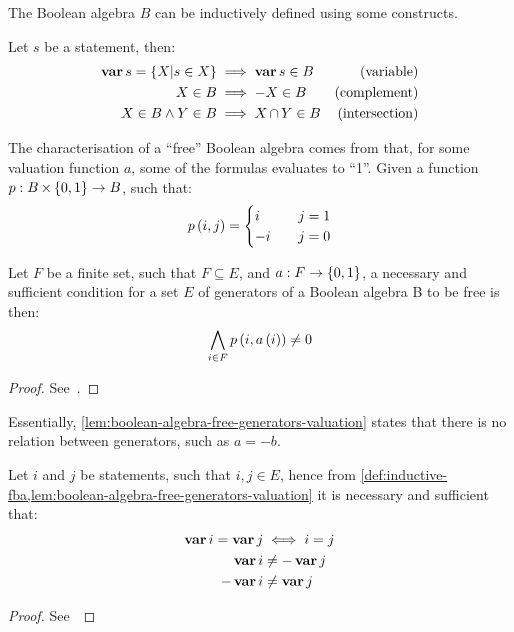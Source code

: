 \documentclass[en,twoside,onehalfspacing,phd]{risethesis}
\def\varop{\ensuremath\operatorname{\mathbf{var}}}
\newcommand{\var}[1]{\ensuremath\varop #1}
\newcommand{\setsin}[1]{\ensuremath\left\{ #1 \right\}}
\newcommand{\parsin}[1]{\ensuremath\left( #1 \right)}
\def\inter{\ensuremath\operatorname{\cap}}
\def\cartesian{\ensuremath\operatorname{\times}}
\begin{document}
The Boolean algebra $B$ can be inductively defined using some constructs.
%
\begin{Def}
\label{def:inductive-fba}
Let $s$ be a statement, then:
%
\begin{subequations}
\begin{align}
\var s = \setsin{X | s \in X} & \implies \var s \in B & \text{(variable)}\\
X \in B & \implies -X \in B                           & \text{(complement)}\\
X \in B \land Y \in B & \implies X \inter Y \in B     & \text{(intersection)}
\end{align}
\end{subequations}
%
\end{Def}

The characterisation of a ``free'' Boolean algebra comes from that, for some valuation function $a$, some of the formulas evaluates to ``1''. 
Given a function $p:B \cartesian \setsin{0,1} \rightarrow B$, such that:
%
\begin{equation}
p\parsin{i,j} = 
\begin{cases}
  i & \quad j = 1\\
  -i & \quad j = 0
\end{cases}
\end{equation}

\begin{Lem}
\label{lem:boolean-algebra-free-generators-valuation}
Let $F$ be a finite set, such that $F \subseteq E$, and $a: F \rightarrow \setsin{0,1}$, a necessary and sufficient condition for a set $E$ of generators of a Boolean algebra B to be free is then:
%
\begin{equation}
\bigwedge_{i \in F} p\parsin{i, a \parsin{i}} \neq 0
\end{equation}
\end{Lem}
\begin{proof}
See~\cite[p. 258]{GH2009}.
\end{proof}


Essentially, \cref{lem:boolean-algebra-free-generators-valuation} states that there is no relation between generators, such as $a = -b$.

\begin{Lem}
Let $i$ and $j$ be statements, such that $i,j \in E$, hence from \cref{def:inductive-fba,lem:boolean-algebra-free-generators-valuation} it is necessary and sufficient that:
%
\begin{subequations}
\begin{align}
\var i = \var j & \iff i = j\\
\var i & \neq - \var j\\
-\var i & \neq \var j
\end{align}
\end{subequations}
%
\end{Lem}
%
\begin{proof}
See~\cite[p. 4]{Huffm2010}
\end{proof}
\end{document}
